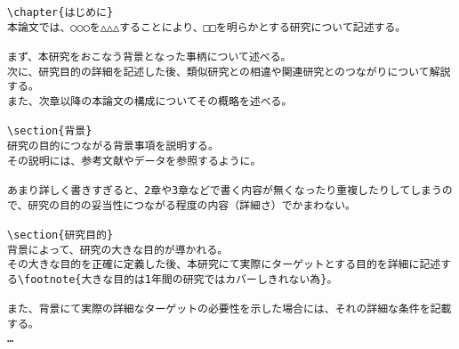 \begin{breakbox}
{\footnotesize
\begin{verbatim}
\chapter{はじめに}
本論文では、○○○を△△△することにより、□□を明らかとする研究について記述する。

まず、本研究をおこなう背景となった事柄について述べる。
次に、研究目的の詳細を記述した後、類似研究との相違や関連研究とのつながりについて解説する。
また、次章以降の本論文の構成についてその概略を述べる。

\section{背景}
研究の目的につながる背景事項を説明する。
その説明には、参考文献やデータを参照するように。

あまり詳しく書きすぎると、2章や3章などで書く内容が無くなったり重複したりしてしまうので、研究の目的の妥当性につながる程度の内容（詳細さ）でかまわない。

\section{研究目的}
背景によって、研究の大きな目的が導かれる。
その大きな目的を正確に定義した後、本研究にて実際にターゲットとする目的を詳細に記述する\footnote{大きな目的は1年間の研究ではカバーしきれない為}。

また、背景にて実際の詳細なターゲットの必要性を示した場合には、それの詳細な条件を記載する。
…
\end{verbatim}
}
\end{breakbox}

